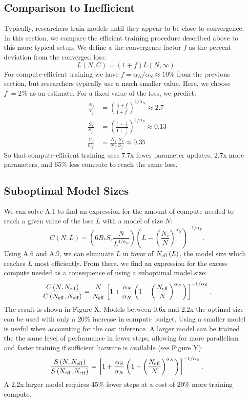 \documentclass[english]{article}
\newcommand{\be}{\begin{equation}}
\newcommand{\ee}{\end{equation}}
\begin{document}
\subsection{Comparison to Inefficient}
Typically, researchers train models until they appear to be close to convergence. In this section, we compare the efficient training procedure described above to this more typical setup.
We define a the convergence factor $f$ as the percent deviation from the converged loss:
\begin{equation}
L\left(N,C\right)=\left(1+f\right)L\left(N,\infty\right).
\end{equation}
For compute-efficient training we have $f=\alpha_{N}/\alpha_{S}\approx10\%$ from the previous section, but researchers typically use a much smaller value. Here, we choose $f^{\prime}=2\%$ as an estimate.
For a fixed value of the loss, we predict:
\begin{align}
\frac{N_{f}}{N_{f^{\prime}}} & =\left(\frac{1+f}{1+f^{\prime}}\right)^{1/\alpha_{N}}\approx2.7\\
\frac{S_{f}}{S_{f^{\prime}}} & =\left(\frac{1+\frac{1}{f}}{1+\frac{1}{f^{\prime}}}\right)^{1/\alpha_{S}}\approx0.13\\
\frac{C_{f}}{C_{f^{\prime}}} & =\frac{N_{f}}{N_{f^{\prime}}}\frac{S_{f}}{S_{f^{\prime}}}\approx0.35
\end{align}
So that compute-efficient training uses 7.7x fewer parameter updates, 2.7x more parameters, and 65\% less compute to reach the same loss.

\subsection{Suboptimal Model Sizes}
\label{sec:suboptimal-models}
We can solve A.1 to find an expression for the amount of compute needed to reach a given value of the loss $L$ with a model of size $N$:
\be
C\left(N,L\right)=\left(6B_{\ast}S_{c}\frac{N}{L^{1/\alpha_{B}}}\right)\left(L-\left(\frac{N_{c}}{N}\right)^{\alpha_{N}}\right)^{-1/\alpha_{S}}.
\ee
Using A.6 and A.9, we can eliminate $L$ in favor of $N_{{\rm eff}}\left(L\right)$, the model size which reaches $L$ most efficiently. From there, we find an expression for the excess compute needed as a consequence of using a suboptimal model size: 
\be
\frac{C\left(N,N_{{\rm eff}}\right)}{C\left(N_{{\rm eff}},N_{{\rm eff}}\right)}=\frac{N}{N_{{\rm eff}}}\left[1+\frac{\alpha_{S}}{\alpha_{N}}\left(1-\left(\frac{N_{{\rm eff}}}{N}\right)^{\alpha_{N}}\right)\right]^{-1/\alpha_{S}}.
\ee
The result is shown in Figure X. Models between 0.6x and 2.2x the optimal size can be used with only a 20\% increase in compute budget. Using a smaller model is useful when accounting for the cost inference. A larger model can be trained the the same level of performance in fewer steps, allowing for more parallelism and faster training if sufficient harware is available (see Figure Y):
\be
\frac{S\left(N,N_{{\rm eff}}\right)}{S\left(N_{{\rm eff}},N_{{\rm eff}}\right)}=\left[1+\frac{\alpha_{S}}{\alpha_{N}}\left(1-\left(\frac{N_{{\rm eff}}}{N}\right)^{\alpha_{N}}\right)\right]^{-1/\alpha_{S}}.
\ee
A 2.2x larger model requires 45\% fewer steps at a cost of 20\% more training compute.
\end{document}
